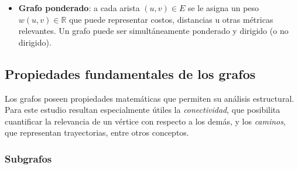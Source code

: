 \begin{itemize}
\begin{center}
                \end{center}
            \item \textbf{Grafo ponderado}: a cada arista $(u, v) \in E$ se le asigna un peso $w(u, v) \in \mathbb{R}$ que puede representar costos, distancias u otras métricas relevantes. Un grafo puede ser simultáneamente ponderado y dirigido (o no dirigido).
                \begin{center}
            \end{center}

        \end{itemize}

    \subsection{Propiedades fundamentales de los grafos}
        Los grafos poseen propiedades matemáticas que permiten su análisis estructural.
        Para este estudio resultan especialmente útiles la \textit{conectividad}, que posibilita cuantificar la relevancia de un vértice con respecto a los demás, y los \textit{caminos}, que representan trayectorias, entre otros conceptos.

        \subsubsection{Subgrafos}

